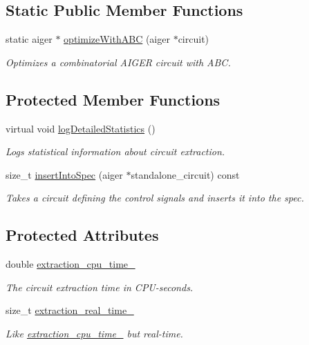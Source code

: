 \subsection*{Static Public Member Functions}
\begin{DoxyCompactItemize}
\item 
static aiger $\ast$ \hyperlink{classCNFImplExtractor_ad21828d816dfdbf672f6e595589ef6e7}{optimize\-With\-A\-B\-C} (aiger $\ast$circuit)
\begin{DoxyCompactList}\small\item\em Optimizes a combinatorial A\-I\-G\-E\-R circuit with A\-B\-C. \end{DoxyCompactList}\end{DoxyCompactItemize}
\subsection*{Protected Member Functions}
\begin{DoxyCompactItemize}
\item 
virtual void \hyperlink{classCNFImplExtractor_abe790c767f6c71a52ef8b0a61ab39eaa}{log\-Detailed\-Statistics} ()
\begin{DoxyCompactList}\small\item\em Logs statistical information about circuit extraction. \end{DoxyCompactList}\item 
size\-\_\-t \hyperlink{classCNFImplExtractor_a0970602635f3356712d57ebb28d12c0d}{insert\-Into\-Spec} (aiger $\ast$standalone\-\_\-circuit) const 
\begin{DoxyCompactList}\small\item\em Takes a circuit defining the control signals and inserts it into the spec. \end{DoxyCompactList}\end{DoxyCompactItemize}
\subsection*{Protected Attributes}
\begin{DoxyCompactItemize}
\item 
double \hyperlink{classCNFImplExtractor_ab8be06d42fd3c4b569ec22cfcf2f508e}{extraction\-\_\-cpu\-\_\-time\-\_\-}
\begin{DoxyCompactList}\small\item\em The circuit extraction time in C\-P\-U-\/seconds. \end{DoxyCompactList}\item 
size\-\_\-t \hyperlink{classCNFImplExtractor_ae06413cf08f868357d64545b3041aa18}{extraction\-\_\-real\-\_\-time\-\_\-}
\begin{DoxyCompactList}\small\item\em Like \hyperlink{classCNFImplExtractor_ab8be06d42fd3c4b569ec22cfcf2f508e}{extraction\-\_\-cpu\-\_\-time\-\_\-} but real-\/time. \end{DoxyCompactList}\end{DoxyCompactItemize}
